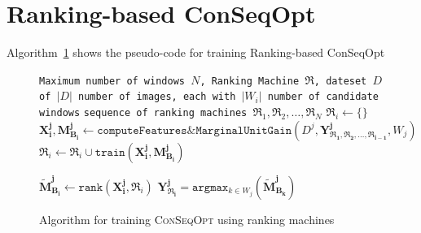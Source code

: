 \documentclass[11pt]{article}
\begin{document}
\section{Ranking-based ConSeqOpt}
Algorithm~\ref{algorithm:ConSeqOpt} shows the pseudo-code for training Ranking-based ConSeqOpt
 \begin{figure}[htb!]
  \begin{minipage}[t]{\textwidth}
    \begin{algorithm}[H]
      \caption{Algorithm for training \textsc{ConSeqOpt} using
          ranking machines}
      \label{conseqopt.rank}
      \begin{algorithmic}[1]
        \REQUIRE \texttt{Maximum number of windows $N$, Ranking Machine
          $\Re$, dateset $D$ of $|D|$ number of images, each with $|W_i|$ number of candidate windows}
        \ENSURE \texttt{sequence of ranking machines $\Re_1, \Re_2, \ldots, \Re_N$}
         \label{reg.line1}
        \STATE $\Re_i \leftarrow \{\}$
        \STATE $\mathbf{X_i^j}, \mathbf{M_{B_i}^j} \leftarrow \texttt{computeFeatures\&MarginalUnitGain}(D^j,\mathbf{Y^j_{\Re_1,\Re_2,\ldots,\Re_{i-1}}}, W_j)$ \label{reg.line2}
        \STATE $\Re_i \leftarrow \Re_i \cup \texttt{train}(\mathbf{X_i^j}, \mathbf{M^j_{B_{i}}})$ \label{reg.line3}
        \ENDFOR
        
        \STATE $\mathbf{\tilde{M}^j_{B_i}} \leftarrow \texttt{rank}(\mathbf{X^j_i}, \Re_i)$ \label{reg.line4}
        \STATE $\mathbf{Y_{\Re_i}^j} = \texttt{argmax$_{k\in W_j}$}(\mathbf{\tilde{M}^j_{B_k}})$ \label{reg.line5}
         \ENDFOR \label{reg.line6}
        \ENDFOR 
     
      \end{algorithmic}
      \label{algorithm:ConSeqOpt}
    \end{algorithm}
  \end{minipage}
  \hfill
\end{figure}
   
\end{document}
